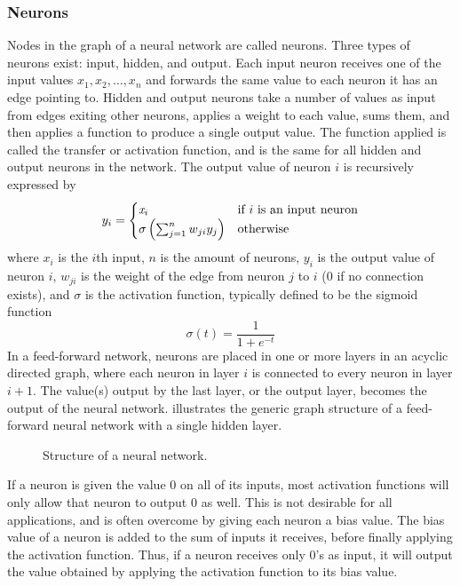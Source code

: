 \subsubsection{Neurons}
Nodes in the graph of a neural network are called neurons. Three types of neurons exist: input, hidden, and output. Each input neuron receives one of the input values $x_1, x_2, \dots, x_n$ and forwards the same value to each neuron it has an edge pointing to. Hidden and output neurons take a number of values as input from edges exiting other neurons, applies a weight to each value, sums them, and then applies a function to produce a single output value. The function applied is called the transfer or activation function, and is the same for all hidden and output neurons in the network. The output value of neuron $i$ is recursively expressed by 
\begin{equation*}\label{eq:weightcalc}
  y_i =
  \begin{cases}
    \mathit{x}_i                     & \text{if } i \text{ is an input neuron} \\
    \sigma\left(\sum_{j=1}^n w_{ji} y_{j}\right) & \text{otherwise}
  \end{cases}
\end{equation*}
%
where $x_i$ is the $i$th input, $n$ is the amount of neurons, $y_i$ is the output value of neuron $i$, $w_{ji}$ is the weight of the edge from neuron $j$ to $i$ ($0$ if no connection exists), and $\sigma$ is the activation function, typically defined to be the sigmoid function
%
\begin{equation*}
  \sigma\left(t\right) = \frac{1}{1+e^{-t}}
\end{equation*}
%
In a feed-forward network, neurons are placed in one or more layers in an acyclic directed graph, where each neuron in layer $i$ is connected to every neuron in layer $i + 1$. The value(s) output by the last layer, or the output layer, becomes the output of the neural network.  illustrates the generic graph structure of a feed-forward neural network with a single hidden layer.
%
\begin{figure}[htpb]
  \centering
  \caption{Structure of a neural network.}
  \label{fig:ann}
\end{figure}
%
If a neuron is given the value $0$ on all of its inputs, most activation functions will only allow that neuron to output $0$ as well. This is not desirable for all applications, and is often overcome by giving each neuron a bias value. The bias value of a neuron is added to the sum of inputs it receives, before finally applying the activation function. Thus, if a neuron receives only $0$'s as input, it will output the value obtained by applying the activation function to its bias value.

